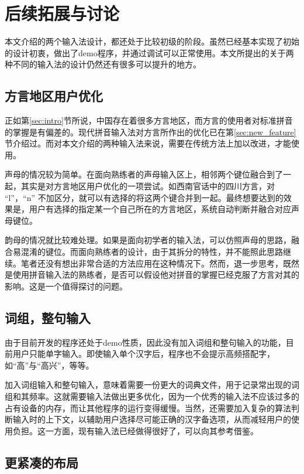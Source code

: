 \chapter{后续拓展与讨论}

本文介绍的两个输入法设计，都还处于比较初级的阶段。虽然已经基本实现了初始的设计初衷，做出了demo程序，并通过调试可以正常使用。本文所提出的关于两种不同的输入法的设计仍然还有很多可以提升的地方。

\section{方言地区用户优化\label{sec:dialect}}

正如第\ref{sec:intro}节所说，中国存在着很多方言地区，而方言的使用者对标准拼音的掌握是有偏差的。现代拼音输入法对方言所作出的优化已在第\ref{sec:new_feature}节介绍过。而对本文介绍的两种输入法来说，需要在传统方法上加以改进，才能使用。

声母的情况较为简单。在面向熟练者的声母输入区上，相邻两个键位融合到了一起，其实是对方言地区用户优化的一项尝试。如西南官话中的四川方言，对 “l”，“n” 不加区分，就可以有选择的将这两个键合并到一起。最终想要达到的效果是，用户有选择的指定某一个自己所在的方言地区，系统自动判断并融合对应声母键位。

韵母的情况就比较难处理。如果是面向初学者的输入法，可以仿照声母的思路，融合易混淆的键位。而面向熟练者的设计，由于其拆分的特性，并不能照此思路继续。笔者还没有想出非常合适的方法应用在这种情况下。然而，退一步思考，既然是使用拼音输入法的熟练者，是否可以假设他对拼音的掌握已经克服了方言对其的影响。这是一个值得探讨的问题。

\section{词组，整句输入}

由于目前开发的程序还处于demo性质，因此没有加入词组和整句输入的功能，目前用户只能单字输入。即使输入单个汉字后，程序也不会提示高频搭配字，如“高”与“高兴”，等等。

加入词组输入和整句输入，意味着需要一份更大的词典文件，用于记录常出现的词组和其频率。这就需要输入法做出更多优化，因为一个优秀的输入法不应该过多的占有设备的内存，而让其他程序的运行变得缓慢。当然，还需要加入复杂的算法判断输入时的上下文，以辅助用户选择尽可能正确的汉字备选项，从而减轻用户的使用负担。这一方面，现有输入法已经做得很好了，可以向其参考借鉴。

\section{更紧凑的布局}

